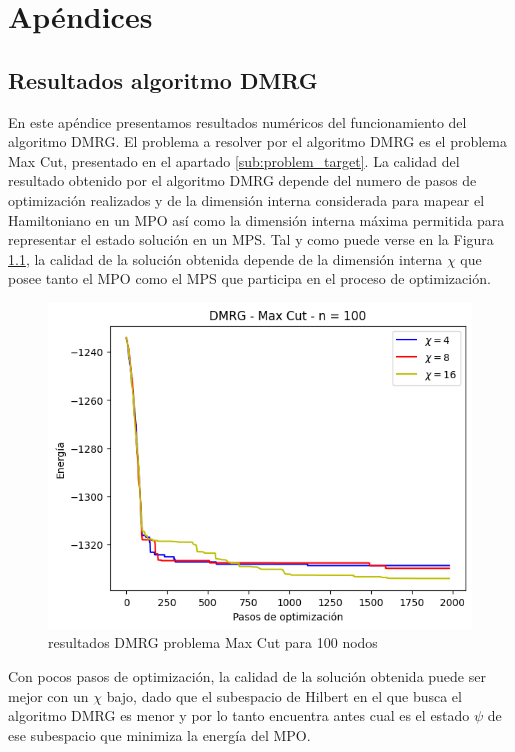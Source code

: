 \appendix
\chapter{Apéndices}

\section{Resultados algoritmo DMRG}
\label{apendix:dmrg}

En este apéndice presentamos resultados numéricos del funcionamiento del algoritmo DMRG. El problema a resolver por el algoritmo DMRG es el problema Max Cut, presentado en el apartado \ref{sub:problem_target}. La calidad del resultado obtenido por el algoritmo DMRG depende del numero de pasos de optimización realizados y de la dimensión interna considerada para mapear el Hamiltoniano en un MPO así como la dimensión interna máxima permitida para representar el estado solución en un MPS. Tal y como puede verse en la Figura \ref{fig:result_dmrg}, la calidad de la solución obtenida depende de la dimensión interna $\chi$ que posee tanto el MPO como el MPS que participa en el proceso de optimización.

\begin{figure}[!h]
    \centering
    \includegraphics[scale = 0.7]{plt/a01-dmrg_max_cut_n_100.png}
    \caption{resultados DMRG problema Max Cut para 100 nodos}
    \label{fig:result_dmrg}
\end{figure}

Con pocos pasos de optimización, la calidad de la solución obtenida puede ser mejor con un $\chi$ bajo, dado que el subespacio de Hilbert en el que busca el algoritmo DMRG es menor y por lo tanto encuentra antes cual es el estado $\psi$ de ese subespacio que minimiza la energía del MPO. 

